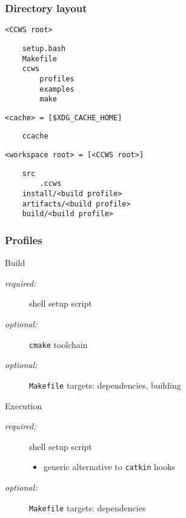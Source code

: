 \documentclass[hyperref={colorlinks=false, breaklinks=true},11pt]{beamer}
\begin{document}
\begin{frame}[fragile]
    \frametitle{Directory layout}

    \begin{block}{\texttt{<CCWS root>}}
\small{
\begin{verbatim}
    setup.bash
    Makefile
    ccws
        profiles
        examples
        make
\end{verbatim}}
    \end{block}

    \begin{block}{\texttt{<cache> = [\$XDG\_CACHE\_HOME]}}
\small{
\begin{verbatim}
    ccache
\end{verbatim}}
    \end{block}

    \begin{block}{\texttt{<workspace root> = [<CCWS root>]}}
\small{
\begin{verbatim}
    src
        .ccws
    install/<build profile>
    artifacts/<build profile>
    build/<build profile>
\end{verbatim}}
    \end{block}
\end{frame}

\begin{frame}
    \frametitle{Profiles}

    \begin{block}{Build}
        \begin{description}
            \item[\it{required:}] shell setup script
            \item[\it{optional:}] \texttt{cmake} toolchain
            \item[\it{optional:}] \texttt{Makefile} targets: dependencies, building
        \end{description}
    \end{block}

    \begin{block}{Execution}
        \begin{description}
            \item[\it{required:}] shell setup script
                \begin{itemize}
                    \item generic alternative to \texttt{catkin} hooks
                \end{itemize}
            \item[\it{optional:}] \texttt{Makefile} targets: dependencies
        \end{description}
    \end{block}
\end{frame}
\end{document}
